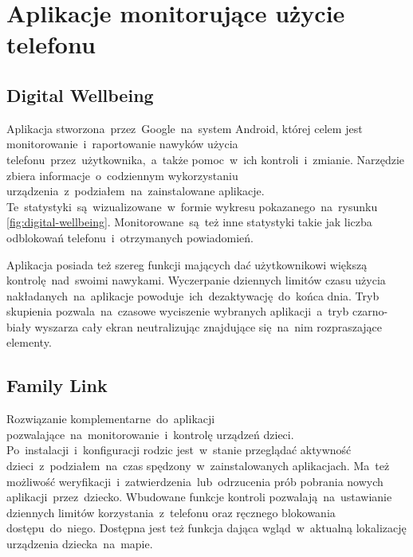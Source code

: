 \section{Aplikacje monitorujące użycie telefonu}

\subsection{Digital Wellbeing}
\label{sec:digital_wellbeing}
Aplikacja stworzona~przez~Google~na~system Android, której celem jest monitorowanie~i~raportowanie nawyków użycia telefonu~przez~użytkownika,~a~także pomoc~w~ich kontroli~i~zmianie. Narzędzie zbiera informacje~o~codziennym wykorzystaniu urządzenia~z~podziałem~na~zainstalowane aplikacje. Te~statystyki~są~wizualizowane~w~formie wykresu pokazanego~na~rysunku \ref{fig:digital-wellbeing}. Monitorowane~są~też inne statystyki takie jak liczba odblokowań telefonu~i~otrzymanych powiadomień. 
\bigskip
{}

Aplikacja posiada też szereg funkcji mających dać użytkownikowi większą kontrolę~nad~swoimi nawykami. Wyczerpanie dziennych limitów czasu użycia nakładanych~na~aplikacje powoduje~ich~dezaktywację~do~końca dnia. Tryb skupienia pozwala~na~czasowe wyciszenie wybranych aplikacji~a~tryb czarno-biały wyszarza cały ekran neutralizując znajdujące się~na~nim rozpraszające elementy.

\subsection{Family Link}
\label{sec:family_link}
Rozwiązanie komplementarne~do~aplikacji  pozwalające~na~monitorowanie~i~kontrolę urządzeń dzieci. Po~instalacji~i~konfiguracji rodzic jest~w~stanie przeglądać aktywność dzieci~z~podziałem~na~czas spędzony~w~zainstalowanych aplikacjach. Ma~też możliwość weryfikacji~i~zatwierdzenia~lub~odrzucenia prób pobrania nowych aplikacji~przez~dziecko. Wbudowane funkcje kontroli pozwalają~na~ustawianie dziennych limitów korzystania~z~telefonu oraz ręcznego blokowania dostępu~do~niego. Dostępna jest też funkcja dająca wgląd~w~aktualną lokalizację urządzenia dziecka~na~mapie.

